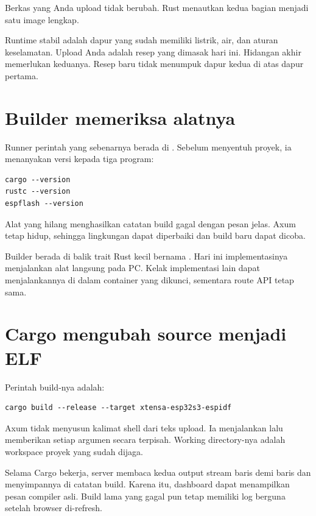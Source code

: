 Berkas yang Anda upload tidak berubah. Rust menautkan kedua bagian menjadi satu image lengkap.

\begin{mentorbox}
Runtime stabil adalah dapur yang sudah memiliki listrik, air, dan aturan keselamatan. Upload Anda adalah resep yang dimasak hari ini. Hidangan akhir memerlukan keduanya. Resep baru tidak menumpuk dapur kedua di atas dapur pertama.
\end{mentorbox}

\section{Builder memeriksa alatnya}

Runner perintah yang sebenarnya berada di . Sebelum menyentuh proyek, ia menanyakan versi kepada tiga program:

\begin{lstlisting}
cargo --version
rustc --version
espflash --version
\end{lstlisting}

Alat yang hilang menghasilkan catatan build gagal dengan pesan jelas. Axum tetap hidup, sehingga lingkungan dapat diperbaiki dan build baru dapat dicoba.

Builder berada di balik trait Rust kecil bernama . Hari ini implementasinya menjalankan alat langsung pada PC. Kelak implementasi lain dapat menjalankannya di dalam container yang dikunci, sementara route API tetap sama.

\section{Cargo mengubah source menjadi ELF}

Perintah build-nya adalah:

\begin{lstlisting}
cargo build --release --target xtensa-esp32s3-espidf
\end{lstlisting}

Axum tidak menyusun kalimat shell dari teks upload. Ia menjalankan  lalu memberikan setiap argumen secara terpisah. Working directory-nya adalah workspace proyek yang sudah dijaga.

Selama Cargo bekerja, server membaca kedua output stream baris demi baris dan menyimpannya di catatan build. Karena itu, dashboard dapat menampilkan pesan compiler asli. Build lama yang gagal pun tetap memiliki log berguna setelah browser di-refresh.

